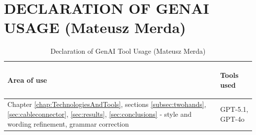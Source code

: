 \section{DECLARATION OF GENAI USAGE (Mateusz Merda)}
\label{chap:genaiMM}





\begin{table}[H]
\caption{Declaration of GenAI Tool Usage (Mateusz Merda)}
\label{tab:genaiMM}
\begin{center}
\begin{tabular}{|p{}|p{}|}
    \hline
    \begin{center}
       \textbf{Area of use}
   \end{center}
   & \begin{center}
       \textbf{Tools used}
   \end{center}
   \\ \hline
Chapter \ref{chap:TechnologiesAndTools}, sections \ref{subsec:twohands}, \ref{sec:cableconnector}, \ref{sec:results}, \ref{sec:conclusions} - style and wording refinement, grammar correction & GPT-5.1, GPT-4o \\
\hline
\end{tabular}
\end{center}
\end{table}


